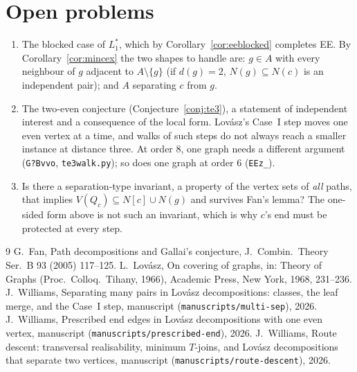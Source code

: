 \documentclass[11pt]{amsart}
\theoremstyle{definition}
\begin{document}
\section{Open problems}\label{sec:open}
\begin{enumerate}
\item The blocked case of $L_1^*$, which by Corollary~\ref{cor:eeblocked} completes EE. By
Corollary~\ref{cor:mincex} the two shapes to handle are: $g\in A$ with every neighbour of $g$
adjacent to $A\setminus\{g\}$ (if $d(g)=2$, $N(g)\subseteq N(c)$ is an independent pair); and $A$
separating $c$ from $g$.
\item The two-even conjecture (Conjecture~\ref{conj:te3}), a statement of independent interest and a
consequence of the local form. Lov\'asz's Case~I step moves one even vertex at a time, and walks of
such steps do not always reach a smaller instance at distance three. At order $8$, one graph needs a
different argument (\texttt{G?Bvvo}, \texttt{te3walk.py}); so does one graph at order $6$
(\texttt{EEz\_}).
\item Is there a separation-type invariant, a property of the vertex sets of \emph{all} paths, that
implies $V(Q_c)\subseteq N[c]\cup N(g)$ and survives Fan's lemma? The one-sided form above is not
such an invariant, which is why $c$'s end must be protected at every step.
\end{enumerate}

\begin{thebibliography}{9}
 G.~Fan, Path decompositions and Gallai's conjecture, J.~Combin.\ Theory Ser.~B 93 (2005)
117--125.
 L.~Lov\'asz, On covering of graphs, in: Theory of Graphs (Proc.\ Colloq.\ Tihany, 1966),
Academic Press, New York, 1968, 231--236.
 J.~Williams, Separating many pairs in Lov\'asz decompositions: classes, the leaf merge, and
the Case~I step, manuscript (\texttt{manuscripts/multi-sep}), 2026.
 J.~Williams, Prescribed end edges in Lov\'asz decompositions with one even vertex,
manuscript (\texttt{manuscripts/prescribed-end}), 2026.
 J.~Williams, Route descent: transversal realisability, minimum $T$-joins, and Lov\'asz
decompositions that separate two vertices, manuscript (\texttt{manuscripts/route-descent}), 2026.
\end{thebibliography}
\end{document}

